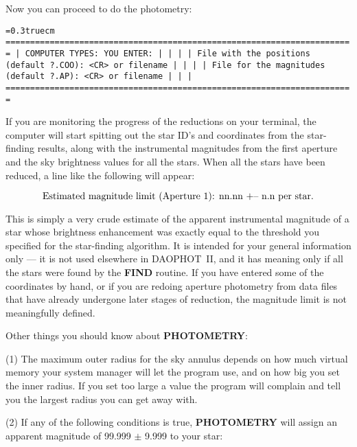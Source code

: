 \vfill
\eject

Now you can proceed to do the photometry:

\bigskip
{\noindent\obeylines\obeyspaces\frenchspacing\tt\baselineskip=0.3truecm
=======================================================================
| COMPUTER TYPES:                                  YOU ENTER:         |
|                                                                     |
|    File with the positions (default ?.COO):      <CR> or filename   |
|                                                                     |
|     File for the magnitudes (default ?.AP):      <CR> or filename   |
|                                                                     |
=======================================================================
}
\bigskip

\noindent If you are monitoring the progress of the reductions on your
terminal, the computer will start spitting out the star ID's and
coordinates from the star-finding results, along with the instrumental
magnitudes from the first aperture and the sky brightness values for
all the stars.  When all the stars have been reduced, a line like the
following will appear:

$$\hbox{\rm Estimated magnitude limit (Aperture 1):  nn.nn +-- n.n per star.}$$

\noindent This is simply a very crude estimate of the apparent
instrumental magnitude of a star whose brightness enhancement was
exactly equal to the threshold you specified for the star-finding
algorithm.  It is intended for your general information only --- it is
not used elsewhere in DAOPHOT~II, and it has meaning only if all the
stars were found by the {\bf FIND} routine.  If you have entered some
of the coordinates by hand, or if you are redoing aperture photometry
from data files that have already undergone later stages of reduction,
the magnitude limit is not meaningfully defined.

Other things you should know about {\bf PHOTOMETRY}:

\item{(1)} The maximum outer radius for the sky annulus depends on how
much virtual memory your system manager will let the program use, and
on how big you set the inner radius.  If you set too large a value the
program will complain and tell you the largest radius you can get away
with.

\item{(2)} If any of the following conditions is true, {\bf PHOTOMETRY}
will assign an apparent magnitude of 99.999 $\pm$ 9.999 to your star:

